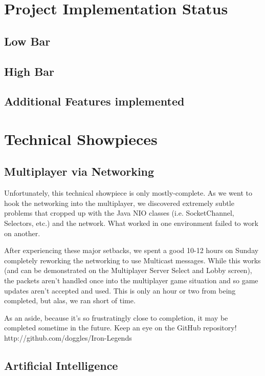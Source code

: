 \documentclass[letterpaper,11pt,twoside]{article}
\begin{document}
\section{Project Implementation Status}

\subsection{Low Bar}

\subsection{High Bar}

\subsection{Additional Features implemented}

\section{Technical Showpieces}

\subsection{Multiplayer via Networking}

Unfortunately, this technical showpiece is only mostly-complete. As we went to hook the networking into the multiplayer, we discovered extremely subtle problems that cropped up with the Java NIO classes (i.e. SocketChannel, Selectors, etc.) and the network. What worked in one environment failed to work on another.

After experiencing these major setbacks, we spent a good 10-12 hours on Sunday completely reworking the networking to use Multicast messages. While this works (and can be demonstrated on the Multiplayer Server Select and Lobby screen), the packets aren't handled once into the multiplayer game situation and so game updates aren't accepted and used. This is only an hour or two from being completed, but alas, we ran short of time.

As an aside, because it's so frustratingly close to completion, it may be completed sometime in the future. Keep an eye on the GitHub repository! http://github.com/doggles/Iron-Legends

\subsection{Artificial Intelligence}
\end{document}
